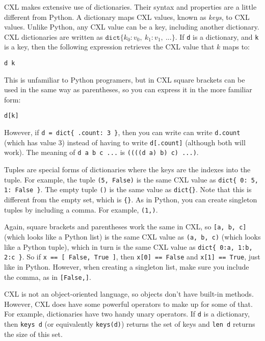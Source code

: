 \documentclass{report}
\newenvironment{code}{
\tcolorbox
}{
\endtcolorbox
}
\begin{document}
CXL makes extensive use of dictionaries.  Their syntax and properties
are a little different from Python.
A dictionary maps CXL values, known as \emph{keys}, to CXL values.
Unlike Python, any CXL value can be a key, including another
dictionary.
CXL dictionaries are written as
$\mathtt{dict}\{ k_0: v_0, ~ k_1: v_1, ~ ... \}$.
If \texttt{d} is a dictionary, and \texttt{k} is a key, then the
following expression retrieves the CXL value that $k$ maps to:
\begin{code}
\begin{verbatim}
d k
\end{verbatim}
\end{code}
This is unfamiliar to Python programers, but in CXL square brackets can be used
in the same way as parentheses, so you can express it in the more familiar form:
\begin{code}
\begin{verbatim}
d[k]
\end{verbatim}
\end{code}
However, if \texttt{d = dict\{ .count: 3 \}}, then you can write
can write \texttt{d.count} (which has value 3) instead of having to write
\texttt{d[.count]} (although both will work).
The meaning of \texttt{d a b c ...} is \texttt{((((d a) b) c) ...)}.

Tuples are special forms of dictionaries where the keys are
the indexes into the tuple.  For example, the tuple
\texttt{(5, False)} is the same CXL value as
\texttt{dict\{ 0: 5, 1: False \}}.
The empty tuple \texttt{()} is the same value as \texttt{dict\{\}}.
Note that this is different from the empty set, which is \texttt{\{\}}.
As in Python, you can create singleton tuples by including a comma.
For example, \texttt{(1,)}.

Again, square brackets and parentheses work the same in CXL, so
\texttt{[a, b, c]} (which looks like a Python list)
is the same CXL value as \texttt{(a, b, c)} (which looks like a Python tuple),
which in turn is the same CXL value as \texttt{dict\{ 0:a, 1:b, 2:c \}}.
So if \texttt{x == [ False, True ]},
then \texttt{x[0] == False} and \texttt{x[1] == True}, just like in Python.
However, when creating a singleton list, make sure you include the
comma, as in \texttt{[False,]}.

CXL is not an object-oriented language, so objects don't have
built-in methods.  However, CXL does have some powerful operators to
make up for some of that.
For example, dictionaries have two handy unary operators.
If \texttt{d} is a
dictionary, then \texttt{keys~d} (or equivalently \texttt{keys(d)})
returns the set of keys and \texttt{len~d} returns the size of
this set.
\end{document}
